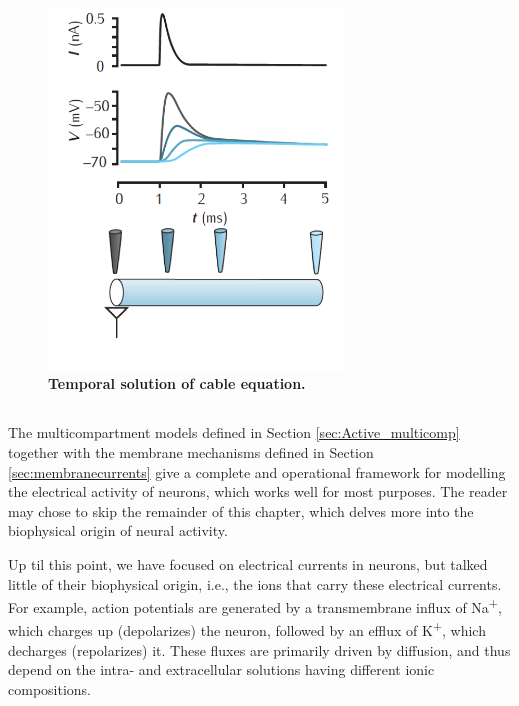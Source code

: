 \begin{figure}[!ht]
\begin{center}
\includegraphics[width=0.7\textwidth]{Figures/Neuron/Temporalcable.png}
\end{center}
\caption{\textbf{Temporal solution of cable equation.}
}
\label{Neuron:fig:temporalrall}
\end{figure}




\subsection{}
\label{sec:Ions_and_reversals}
The multicompartment models defined in Section \ref{sec:Active_multicomp} together with the membrane mechanisms defined in Section \ref{sec:membranecurrents} give a complete and operational framework for modelling the electrical activity of neurons, which works well for most purposes. The reader may chose to skip the remainder of this chapter, which delves more into the biophysical origin of neural activity. 

Up til this point, we have focused on electrical currents in neurons, but talked little of their biophysical origin, i.e., the ions that carry these electrical currents. For example, action potentials are generated by a transmembrane influx of Na\textsuperscript{+}, which charges up (depolarizes) the neuron, followed by an efflux of K\textsuperscript{+}, which decharges (repolarizes) it. These fluxes are primarily driven by diffusion, and thus depend on the intra- and extracellular solutions having different ionic compositions. 

